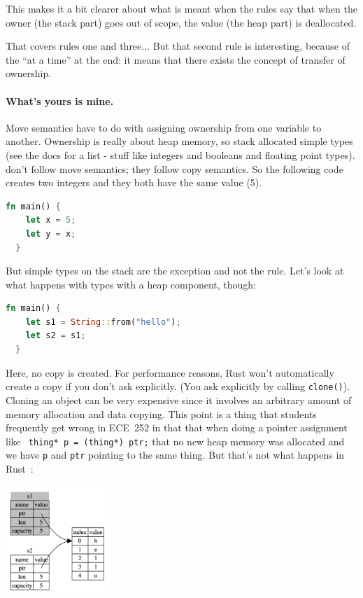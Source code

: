 This makes it a bit clearer about what is meant when the rules say that when the owner (the stack part) goes out of scope, the value (the heap part) is deallocated.

That covers rules one and three... But that second rule is interesting, because of the ``at a time'' at the end: it means that there exists the concept of transfer of ownership. 

\paragraph{What's yours is mine.}
Move semantics have to do with assigning ownership from one variable to another. Ownership is really about heap memory, so stack allocated simple types (see the docs for a list - stuff like integers and booleans and floating point types). don't follow move semantics; they follow copy semantics. So the following code creates two integers and they both have the same value (5).

\begin{lstlisting}[language=Rust]
  fn main() {
   	let x = 5;
	let y = x;
  }
\end{lstlisting}

But simple types on the stack are the exception and not the rule. Let's look at what happens with types with a heap component, though:

\begin{lstlisting}[language=Rust]
  fn main() {
    let s1 = String::from("hello");
    let s2 = s1;
  }
\end{lstlisting}

Here, no copy is created. For performance reasons, Rust won't automatically create a copy if you don't ask explicitly. (You ask explicitly by calling \texttt{clone()}). Cloning an object can be very expensive since it involves an arbitrary amount of memory allocation and data copying. This point is a thing that students frequently get wrong in ECE~252 in that that when doing a pointer assignment like \texttt{ thing* p = (thing*) ptr;} that no new heap memory was allocated and we have \texttt{p} and \texttt{ptr} pointing to the same thing. But that's not what happens in Rust~\cite{rustdocs}:

\begin{center}
\includegraphics[width=0.3\textwidth]{images/string-rust.png}
\end{center}

